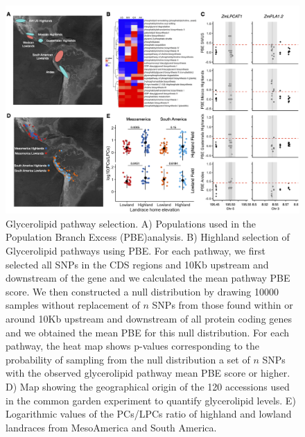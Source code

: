 \documentclass[9pt,twocolumn,twoside]{BioRxiv}
\begin{document}
\begin{figure}[h]
\begin{center}
\includegraphics[width=0.7\paperwidth]{Figures/Fig_1.png}
\caption{Glycerolipid pathway selection. 
A) Populations used in the Population Branch Excess (PBE)analysis. 
B) Highland selection of Glycerolipid pathways using PBE. 
For each pathway, we first selected all SNPs in the CDS regions and 10Kb upstream and downstream of the gene and we calculated the mean pathway PBE score. 
We then constructed a null distribution by drawing 10000 samples without replacement of $n$ SNPs from those found within or around 10Kb upstream and downstream of all protein coding genes and we obtained the mean PBE for this null distribution. 
For each pathway, the heat map shows p-values corresponding to the probability of sampling from the null distribution a set of $n$ SNPs with the observed glycerolipid pathway mean PBE score or higher.
D) Map showing the geographical origin of the 120 accessions used in the common garden experiment to quantify glycerolipid levels.
E) Logarithmic values of the PCs/LPCs ratio of highland and lowland landraces from MesoAmerica and South America.
} 
\label{Fig1}
\end{center}
\end{figure} 
\end{document}
